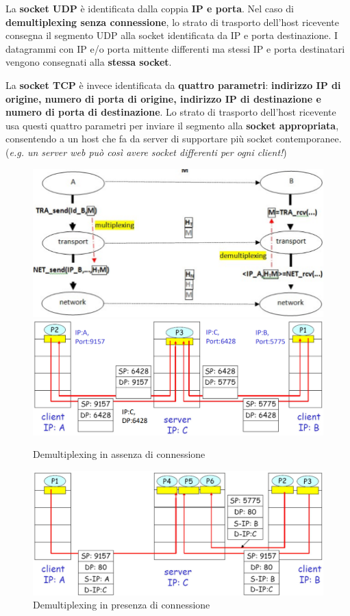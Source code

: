 \documentclass[11pt,a4paper,oneside]{book}
\theoremstyle{definition}
\begin{document}
La \textbf{socket UDP} è identificata dalla coppia \textbf{IP e porta}. Nel caso di \textbf{demultiplexing senza connessione}, lo strato di trasporto dell'host ricevente consegna il segmento UDP alla socket identificata da IP e porta destinazione. I datagrammi con IP e/o porta mittente differenti ma stessi IP e porta destinatari vengono consegnati alla \textbf{stessa socket}.

La \textbf{socket TCP} è invece identificata da \textbf{quattro parametri}: \textbf{indirizzo IP di origine, numero di porta di origine, indirizzo IP di destinazione e numero di porta di destinazione}. Lo strato di trasporto dell'host ricevente usa questi quattro parametri per inviare il segmento alla \textbf{socket appropriata}, consentendo a un host che fa da server di supportare più socket contemporanee. (\textit{e.g. un server web può così avere socket differenti per ogni client!})

\pagebreak

\begin{figure}[!h]
	\includegraphics[scale=0.3]{Immagini/app_trans_net_int.png}
	\includegraphics[scale=0.3]{Immagini/no_conn_demul.png}
	\centering
	\caption{Demultiplexing in assenza di connessione}
\end{figure}

\begin{figure}[!h]
	\includegraphics[scale=0.3]{Immagini/conn_demul.png}
	\centering
	\caption{Demultiplexing in presenza di connessione}
\end{figure}
\end{document}
